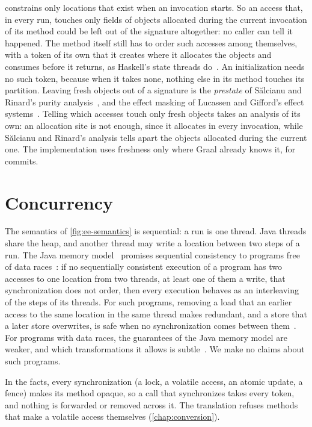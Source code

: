 constrains only locations that exist when an
invocation starts. So an access that, in every run, touches only fields of
objects allocated during the current invocation of its method could be left out
of the signature altogether: no caller can tell it happened. The method itself
still has to order such accesses among themselves, with a token of its own that
it creates where it allocates the objects and consumes before it returns, as
Haskell's state threads do~\cite{launchbury1994state}. An initialization needs
no such token, because when it takes none, nothing else in its method touches
its partition. Leaving fresh objects out of a signature is the \emph{prestate}
of S\u{a}lcianu and Rinard's purity analysis~\cite{salcianu2005purity}, and the
effect masking of Lucassen and Gifford's effect
systems~\cite{lucassen1988effects}. Telling which accesses touch only fresh
objects takes an analysis of its own: an allocation site is not enough, since it
allocates in every invocation, while S\u{a}lcianu and Rinard's analysis tells
apart the objects allocated during the current one. The implementation uses
freshness only where Graal already knows it, for commits.

\section{Concurrency}\label{sec:ee-concurrency}

The semantics of \cref{fig:ee-semantics} is sequential: a run is one thread.
Java threads share the heap, and another thread may write a location between
two steps of a run. The Java memory model~\cite{manson2005jmm} promises
sequential consistency to programs free of data races~\cite{adve1990weak}: if no
sequentially consistent execution of a program has two accesses to one location
from two threads, at least one of them a write, that synchronization does not
order, then every execution behaves as an interleaving of the steps of its
threads. For such programs, removing a load that an earlier access to the same
location in the same thread makes redundant, and a store that a later store
overwrites, is safe when no synchronization comes between
them~\cite{sevcik2011safe}. For programs with data races, the guarantees of the
Java memory model are weaker, and which transformations it allows is
subtle~\cite{sevcik2008validity}. We make no claims about such programs.

In the facts, every synchronization (a lock, a volatile access, an atomic
update, a fence) makes its method opaque, so a call that synchronizes takes
every token, and nothing is forwarded or removed across it. The translation
refuses methods that make a volatile access themselves (\cref{chap:conversion}).

